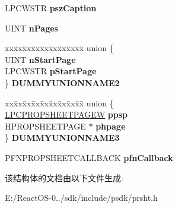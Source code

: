 \begin{DoxyCompactItemize}
\begin{tabbing}
\end{tabbing}\item 
\mbox{\label{struct___p_r_o_p_s_h_e_e_t_h_e_a_d_e_r_w_aab76625d1168cd6f88b0ea0041941756}} 
L\+P\+C\+W\+S\+TR {\bfseries psz\+Caption}
\item 
\mbox{\label{struct___p_r_o_p_s_h_e_e_t_h_e_a_d_e_r_w_ad92d427d864e46e4d6c67c78e6c706db}} 
U\+I\+NT {\bfseries n\+Pages}
\item 
\mbox{\label{struct___p_r_o_p_s_h_e_e_t_h_e_a_d_e_r_w_a370499ad8dc102e7a81f40d5e2906175}} 
\begin{tabbing}
xx\=xx\=xx\=xx\=xx\=xx\=xx\=xx\=xx\=\kill
union \{\\
\>UINT {\bfseries nStartPage}\\
\>LPCWSTR {\bfseries pStartPage}\\
\} {\bfseries DUMMYUNIONNAME2}\\

\end{tabbing}\item 
\mbox{\label{struct___p_r_o_p_s_h_e_e_t_h_e_a_d_e_r_w_a68e86f3f3db50bcb6b0935ea21842118}} 
\begin{tabbing}
xx\=xx\=xx\=xx\=xx\=xx\=xx\=xx\=xx\=\kill
union \{\\
\>\hyperlink{struct___p_r_o_p_s_h_e_e_t_p_a_g_e_w}{LPCPROPSHEETPAGEW} {\bfseries ppsp}\\
\>HPROPSHEETPAGE $\ast$ {\bfseries phpage}\\
\} {\bfseries DUMMYUNIONNAME3}\\

\end{tabbing}\item 
\mbox{\label{struct___p_r_o_p_s_h_e_e_t_h_e_a_d_e_r_w_a89f697dc9b960ff6469667205f7b3d49}} 
P\+F\+N\+P\+R\+O\+P\+S\+H\+E\+E\+T\+C\+A\+L\+L\+B\+A\+CK {\bfseries pfn\+Callback}
\end{DoxyCompactItemize}


该结构体的文档由以下文件生成\+:\begin{DoxyCompactItemize}
\item 
E\+:/\+React\+O\+S-\/0../sdk/include/psdk/prsht.\+h\end{DoxyCompactItemize}
